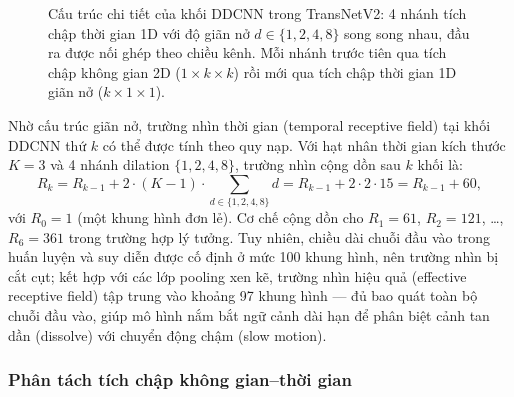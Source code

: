 \begin{figure}[H]
{
    }
    \caption[Cấu trúc khối DDCNN trong TransNetV2]{Cấu trúc chi tiết của khối DDCNN trong TransNetV2: 4 nhánh tích chập thời gian 1D với độ giãn nở $d \in \{1,2,4,8\}$ song song nhau, đầu ra được nối ghép theo chiều kênh. Mỗi nhánh trước tiên qua tích chập không gian 2D ($1\times k\times k$) rồi mới qua tích chập thời gian 1D giãn nở ($k\times 1\times 1$).}
    \label{fig:ddcnn_block}
\end{figure}

Nhờ cấu trúc giãn nở, trường nhìn thời gian (temporal receptive field) tại khối DDCNN thứ $k$ có thể được tính theo quy nạp. Với hạt nhân thời gian kích thước $K = 3$ và 4 nhánh dilation $\{1, 2, 4, 8\}$, trường nhìn cộng dồn sau $k$ khối là:
\begin{equation}
    R_k = R_{k-1} + 2 \cdot (K - 1) \cdot \sum_{d \in \{1,2,4,8\}} d
    = R_{k-1} + 2 \cdot 2 \cdot 15 = R_{k-1} + 60,
    \label{eq:receptive_field}
\end{equation}
với $R_0 = 1$ (một khung hình đơn lẻ). Cơ chế cộng dồn cho $R_1 = 61$, $R_2 = 121$, \dots, $R_6 = 361$ trong trường hợp lý tưởng. Tuy nhiên, chiều dài chuỗi đầu vào trong huấn luyện và suy diễn được cố định ở mức 100 khung hình, nên trường nhìn bị cắt cụt; kết hợp với các lớp pooling xen kẽ, trường nhìn hiệu quả (effective receptive field) tập trung vào khoảng 97 khung hình — đủ bao quát toàn bộ chuỗi đầu vào, giúp mô hình nắm bắt ngữ cảnh dài hạn để phân biệt cảnh tan dần (dissolve) với chuyển động chậm (slow motion).

\subsubsection{Phân tách tích chập không gian–thời gian}
\label{subsubsec:factorized_conv}


